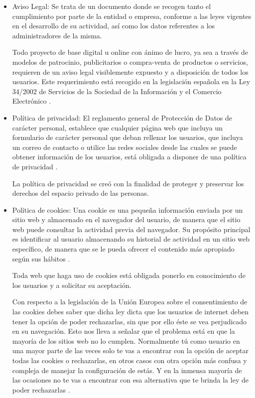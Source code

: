 \documentclass[
  a4paper,
  openany]{book}
\begin{document}
\begin{itemize}
\item
  Aviso Legal: Se trata de un documento donde se recogen tanto el cumplimiento por parte de la entidad o empresa, conforme a las leyes vigentes en el desarrollo de su actividad, así como los datos referentes a los administradores de la misma.

  Todo proyecto de base digital u online con ánimo de lucro, ya sea a través de modelos de patrocinio, publicitarios o compra-venta de productos o servicios, requieren de un aviso legal visiblemente expuesto y a disposición de todos los usuarios. Este requerimiento está recogido en la legislación española en la Ley 34/2002 de Servicios de la Sociedad de la Información y el Comercio Electrónico \citep{IONOS-legal}.
\item
  Política de privacidad: El reglamento general de Protección de Datos de carácter personal, establece que cualquier página web que incluya un formulario de carácter personal que deban rellenar los usuarios, que incluya un correo de contacto o utilice las redes sociales desde las cuales se puede obtener información de los usuarios, está obligada a disponer de una política de privacidad \citep{IONOS-privacidad}.

  La política de privacidad se creó con la finalidad de proteger y preservar los derechos del espacio privado de las personas.
\item
  Política de cookies: Una cookie es una pequeña información enviada por un sitio web y almacenado en el navegador del usuario, de manera que el sitio web puede consultar la actividad previa del navegador. Su propósito principal es identificar al usuario almacenando su historial de actividad en un sitio web específico, de manera que se le pueda ofrecer el contenido más apropiado según sus hábitos \citep{IONOS-cookies}.

  Toda web que haga uso de cookies está obligada ponerlo en conocimiento de los usuarios y a solicitar su aceptación.

  Con respecto a la legislación de la Unión Europea sobre el consentimiento de las cookies debes saber que dicha ley dicta que los usuarios de internet deben tener la opción de poder rechazarlas, sin que por ello éste se vea perjudicado en su navegación. Esto nos lleva a señalar que el problema está en que la mayoría de los sitios web no lo cumplen. Normalmente tú como usuario en una mayor parte de las veces solo te vas a encontrar con la opción de aceptar todas las cookies o rechazarlas, en otros casos con otra opción más confusa y compleja de manejar la configuración de estás. Y en la inmensa mayoría de las ocasiones no te vas a encontrar con esa alternativa que te brinda la ley de poder rechazarlas \citep{GEN-rechazar-cookies}.
\end{itemize}
\end{document}
